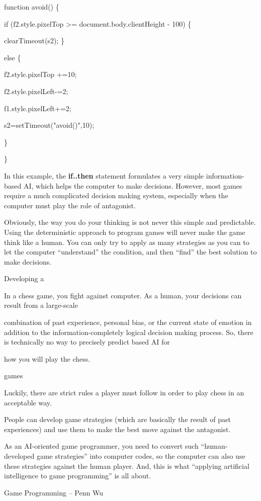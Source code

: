 \documentclass[
]{article}
\begin{document}
function avoid() \{

if (f2.style.pixelTop \textgreater= document.body.clientHeight - 100) \{

clearTimeout(s2); \}

else \{

f2.style.pixelTop +=10;

f2.style.pixelLeft-=2;

f1.style.pixelLeft+=2;

s2=setTimeout("avoid()",10);

\}

\}

In this example, the \textbf{if..then} statement formulates a very
simple information-based AI, which helps the computer to make decisions.
However, most games require a much complicated decision making system,
especially when the computer must play the role of antagonist.

Obviously, the way you do your thinking is not never this simple and
predictable. Using the deterministic approach to program games will
never make the game think like a human. You can only try to apply as
many strategies as you can to let the computer ``understand'' the
condition, and then ``find'' the best solution to make decisions.

Developing a

In a chess game, you fight against computer. As a human, your decisions
can result from a large-scale

combination of past experience, personal bias, or the current state of
emotion in addition to the information-completely logical decision
making process. So, there is technically no way to precisely predict
based AI for

how you will play the chess.

games

Luckily, there are strict rules a player must follow in order to play
chess in an acceptable way.

People can develop game strategies (which are basically the result of
past experiences) and use them to make the best move against the
antagonist.

As an AI-oriented game programmer, you need to convert such
``human-developed game strategies'' into computer codes, so the computer
can also use these strategies against the human player. And, this is
what ``applying artificial intelligence to game programming'' is all
about.

Game Programming -- Penn Wu
\end{document}
